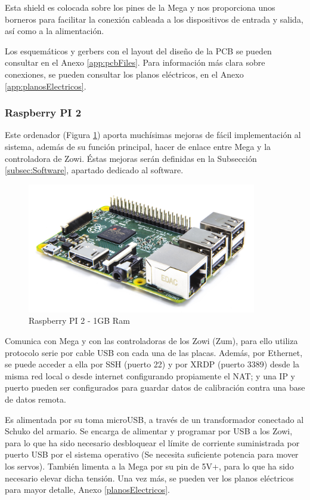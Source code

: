 Esta shield es colocada sobre los pines de la Mega y nos proporciona unos borneros para facilitar la conexión cableada a los dispositivos de entrada y salida, así como a la alimentación.

Los esquemáticos y gerbers con el layout del diseño de la PCB se pueden consultar en el Anexo \ref{app:pcbFiles}. Para información más clara sobre conexiones, se pueden consultar los planos eléctricos, en el Anexo \ref{app:planosElectricos}.

\subsubsection{Raspberry PI 2}

Este ordenador (Figura \ref{fig:raspi}) aporta muchísimas mejoras de fácil implementación al sistema, además de su función principal, hacer de enlace entre Mega y la controladora de Zowi. Éstas mejoras serán definidas en la Subsección \ref{subsec:Software}, apartado dedicado al software.

\begin{figure}
\centering
\includegraphics[width=100mm]{Figures/raspi}
\caption{Raspberry PI 2 - 1GB Ram}
\label{fig:raspi}
\end{figure}

Comunica con Mega y con las controladoras de los Zowi (Zum), para ello utiliza protocolo serie por cable USB con cada una de las placas. Además, por Ethernet, se puede acceder a ella por SSH (puerto 22) y por XRDP (puerto 3389) desde la misma red local o desde internet configurando propiamente el NAT; y una IP y puerto pueden ser configurados para guardar datos de calibración contra una base de datos remota.

Es alimentada por su toma microUSB, a través de un transformador conectado al Schuko del armario. Se encarga de alimentar y programar por USB a los Zowi, para lo que ha sido necesario desbloquear el límite de corriente suministrada por puerto USB por el sistema operativo (Se necesita suficiente potencia para mover los servos). También limenta a la Mega por su pin de 5V+, para lo que ha sido necesario elevar dicha tensión. Una vez más, se pueden ver los planos eléctricos para mayor detalle, Anexo \ref{planosElectricos}.

